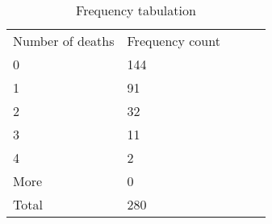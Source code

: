 \documentclass{tufte-book}
\theoremstyle{mytheoremstyle}
\theoremstyle{mylemstyle}
\theoremstyle{mydefstyle}
\begin{document}
\begin{table}
\centering
\caption{Frequency tabulation}
\label{freq-tab}
\begin{tabular}{|l|l|lll}
\cline{1-2}
Number of deaths & Frequency count \\ \cline{1-2}
0                & 144             \\ \cline{1-2}
1                & 91              \\ \cline{1-2}
2                & 32              \\ \cline{1-2}
3                & 11              \\ \cline{1-2}
4                & 2               \\ \cline{1-2}
More             & 0               \\ \cline{1-2}
Total            & 280             \\ \cline{1-2}
\end{tabular}
\end{table}
\end{document}
